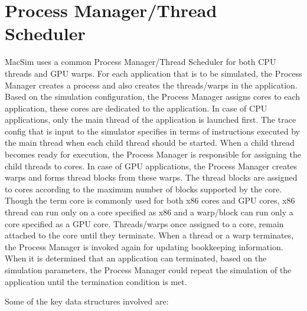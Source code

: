 
\chapter{Process Manager/Thread Scheduler}
\label{sec:process_manager}


MacSim uses a common Process Manager/Thread Scheduler for both CPU threads and
GPU warps. For each application that is to be simulated, the Process Manager
creates a process and also creates the threads/warps in the application. Based
on the simulation configuration, the Process Manager assigns cores to each
application, these cores are dedicated to the application. In case of CPU
applications, only the main thread of the application is launched first. The
trace config that is input to the simulator specifies in terms of instructions
executed by the main thread when each child thread should be started. When a
child thread becomes ready for execution, the Process Manager is responsible
for assigning the child threads to cores. In case of GPU applications, the
Process Manager creates warps and forms thread blocks from these warps. The
thread blocks are assigned to cores according to the maximum number of blocks
supported by the core. Though the term core is commonly used for both x86 cores
and GPU cores, x86 thread can run only on a core
specified as x86 and a warp/block can run only a core specified as a GPU core.
Threads/warps once assigned to a core, remain attached to the core until they
terminate. When a thread or a warp terminates, the Process Manager is invoked
again for updating bookkeeping information. When it is determined that an
application can terminated, based on the simulation parameters, the Process
Manager could repeat the simulation of the application until the termination
condition is met.



Some of the key data structures involved are:


